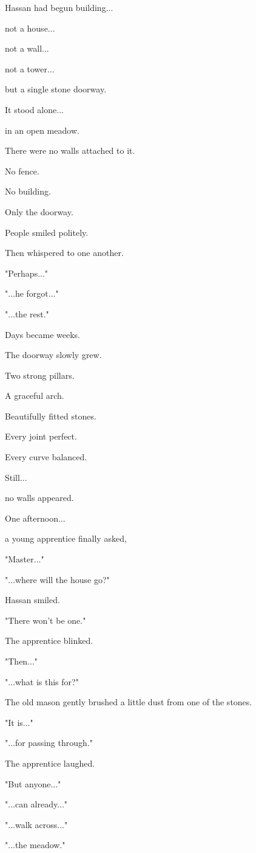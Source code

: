 \documentclass[12pt,openany]{book}
\begin{document}
Hassan had begun building...

not a house...

not a wall...

not a tower...

but a single stone doorway.

It stood alone...

in an open meadow.

There were no walls attached to it.

No fence.

No building.

Only the doorway.

People smiled politely.

Then whispered to one another.

"Perhaps..."

"...he forgot..."

"...the rest."

Days became weeks.

The doorway slowly grew.

Two strong pillars.

A graceful arch.

Beautifully fitted stones.

Every joint perfect.

Every curve balanced.

Still...

no walls appeared.

One afternoon...

a young apprentice finally asked,

"Master..."

"...where will the house go?"

Hassan smiled.

"There won't be one."

The apprentice blinked.

"Then..."

"...what is this for?"

The old mason gently brushed a little dust from one of the stones.

"It is..."

"...for passing through."

The apprentice laughed.

"But anyone..."

"...can already..."

"...walk across..."

"...the meadow."
\end{document}
